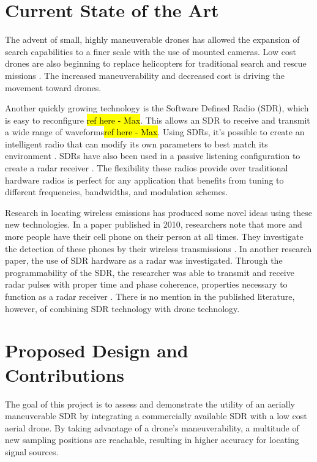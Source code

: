 \section{Current State of the Art}
The advent of small, highly maneuverable drones has allowed the expansion of search capabilities to a finer scale with the use of mounted cameras. Low cost drones are also beginning to replace helicopters for traditional search and rescue missions \cite{drone_replacement}. The increased maneuverability and decreased cost is driving the movement toward drones.\par
Another quickly growing technology is the Software Defined Radio (SDR), which is easy to reconfigure \hl{ref here - Max}. This allows an SDR to receive and transmit a wide range of waveforms\hl{ref here - Max}. Using SDRs, it’s possible to create an intelligent radio that can modify its own parameters to best match its environment \cite{int_radio}. SDRs have also been used in a passive listening configuration to create a radar receiver \cite{radar_conf}. The flexibility these radios provide over traditional hardware radios is perfect for any application that benefits from tuning to different frequencies, bandwidths, and modulation schemes.\par
Research in locating wireless emissions has produced some novel ideas using these new technologies. In a paper published in 2010, researchers note that more and more people have their cell phone on their person at all times. They investigate the detection of these phones by their wireless transmissions \cite{novel_localization}. In another research paper, the use of SDR hardware as a radar was investigated. Through the programmability of the SDR, the researcher was able to transmit and receive radar pulses with proper time and phase coherence, properties necessary to function as a radar receiver \cite{GNR_sdr}. There is no mention in the published literature, however, of combining SDR technology with drone technology.\par
\section{Proposed Design and Contributions}
The goal of this project is to assess and demonstrate the utility of an aerially maneuverable SDR by integrating a commercially available SDR with a low cost aerial drone. By taking advantage of a drone's maneuverability, a multitude of new sampling positions are reachable, resulting in higher accuracy for locating signal sources.\par

